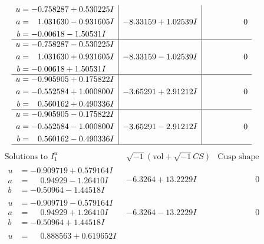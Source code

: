 \documentclass[1p]{elsarticle_modified}
\theoremstyle{definition}
\newcommand{\I}{\sqrt{-1}}
\begin{document}
$$\begin{array}{c|c|c}
\begin{aligned}
u &= -0.758287 + 0.530225 I \\
a &= \phantom{-}1.031630 - 0.931605 I \\
b &= -0.00618 - 1.50531 I\end{aligned}
 & -8.33159 + 1.02539 I & \phantom{-0.000000 } 0 \\ \hline\begin{aligned}
u &= -0.758287 - 0.530225 I \\
a &= \phantom{-}1.031630 + 0.931605 I \\
b &= -0.00618 + 1.50531 I\end{aligned}
 & -8.33159 - 1.02539 I & \phantom{-0.000000 } 0 \\ \hline\begin{aligned}
u &= -0.905905 + 0.175822 I \\
a &= -0.552584 + 1.000800 I \\
b &= \phantom{-}0.560162 + 0.490336 I\end{aligned}
 & -3.65291 + 2.91212 I & \phantom{-0.000000 } 0 \\ \hline\begin{aligned}
u &= -0.905905 - 0.175822 I \\
a &= -0.552584 - 1.000800 I \\
b &= \phantom{-}0.560162 - 0.490336 I\end{aligned}
 & -3.65291 - 2.91212 I & \phantom{-0.000000 } 0\\
 \hline 
 \end{array}$$\newpage$$\begin{array}{c|c|c}  
\text{Solutions to }I^u_{1}& \I (\text{vol} + \sqrt{-1}CS) & \text{Cusp shape}\\
 \hline 
\begin{aligned}
u &= -0.909719 + 0.579164 I \\
a &= \phantom{-}0.94929 - 1.26410 I \\
b &= -0.50964 - 1.44518 I\end{aligned}
 & -6.3264 + 13.2229 I & \phantom{-0.000000 } 0 \\ \hline\begin{aligned}
u &= -0.909719 - 0.579164 I \\
a &= \phantom{-}0.94929 + 1.26410 I \\
b &= -0.50964 + 1.44518 I\end{aligned}
 & -6.3264 - 13.2229 I & \phantom{-0.000000 } 0 \\ \hline\begin{aligned}
u &= \phantom{-}0.888563 + 0.619652 I \\

\end{aligned}
\end{array}$$
\end{document}
